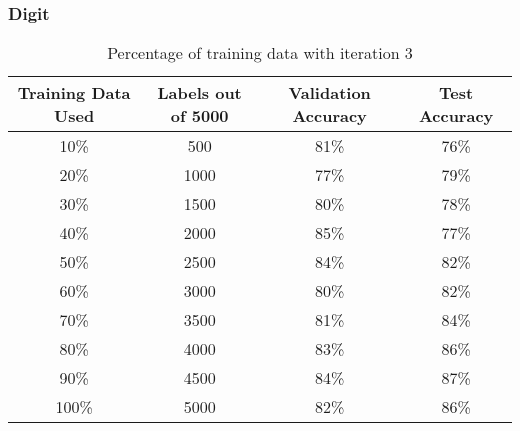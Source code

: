 \documentclass{article}
\begin{document}
        \subsubsection{Digit}
            \begin{table}[h]
                \centering
                \begin{tabular}{c|c|c|c}
                    \hline
                        Training Data Used & Labels out of 5000 & Validation Accuracy & Test Accuracy \\
                    \hline
                        10\% & 500 & 81\% & 76\%\\
                    \hline
                        20\% & 1000 & 77\% & 79\%\\
                    \hline
                        30\% & 1500 & 80\% & 78\%\\
                    \hline
                        40\% & 2000 & 85\% & 77\%\\
                    \hline
                        50\% & 2500 & 84\% & 82\%\\
                    \hline
                        60\% & 3000 & 80\% & 82\%\\
                    \hline
                        70\% & 3500 & 81\% & 84\%\\
                    \hline
                        80\% & 4000 & 83\% & 86\%\\
                    \hline
                        90\% & 4500 & 84\% & 87\%\\
                    \hline
                        100\% & 5000 & 82\% & 86\%\\
                    \hline
                \end{tabular}
                \caption{Percentage of training data with iteration 3}
            \end{table}
        \newpage
\end{document}
